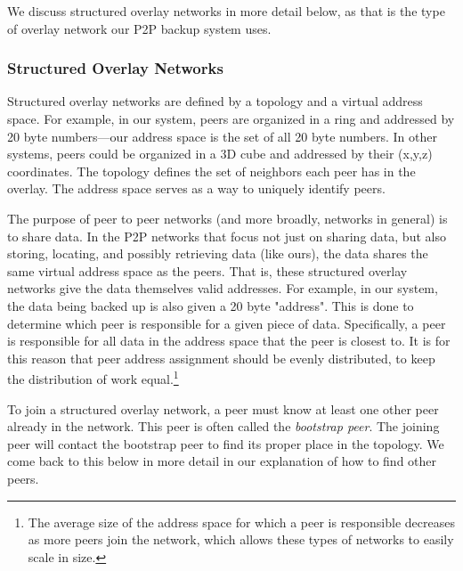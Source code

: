 \documentclass[12pt]{report}
\begin{document}
We discuss structured overlay networks in more detail below, as that is the type of overlay network our P2P backup system uses.

\subsubsection{Structured Overlay Networks} \label{subsubsec:StructuredOverlayNetworks}

Structured overlay networks are defined by a topology and a virtual address space. For example, in our system, peers are organized in a ring and addressed by 20 byte numbers---our address space is the set of all 20 byte numbers. In other systems, peers could be organized in a 3D cube and addressed by their (x,y,z) coordinates. The topology defines the set of neighbors each peer has in the overlay. The address space serves as a way to uniquely identify peers.

The purpose of peer to peer networks (and more broadly, networks in general) is to share data. In the P2P networks that focus not just on sharing data, but also storing, locating, and possibly retrieving data (like ours), the data shares the same virtual address space as the peers. That is, these structured overlay networks give the data themselves valid addresses. For example, in our system, the data being backed up is also given a 20 byte "address". This is done to determine which peer is responsible for a given piece of data. Specifically, a peer is responsible for all data in the address space that the peer is closest to. It is for this reason that peer address assignment should be evenly distributed, to keep the distribution of work equal.\footnote{The average size of the address space for which a peer is responsible decreases as more peers join the network, which allows these types of networks to easily scale in size.}

To join a structured overlay network, a peer must know at least one other peer already in the network. This peer is often called the \textit{bootstrap peer}. The joining peer will contact the bootstrap peer to find its proper place in the topology. We come back to this below in more detail in our explanation of how to find other peers.
\end{document}
